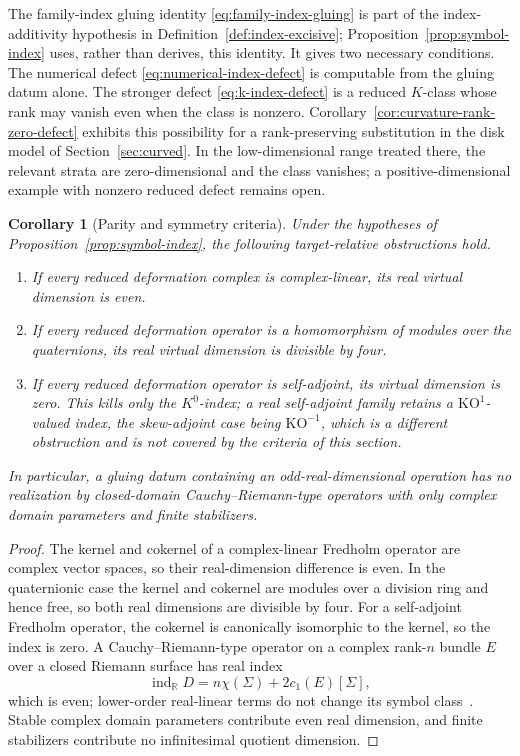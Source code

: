 \documentclass[11pt,letterpaper,twoside]{article}
\theoremstyle{plain}
\newtheorem{corollary}[theorem]{Corollary}
\theoremstyle{definition}
\theoremstyle{remark}
\let\cite\citep
\begin{document}
The family-index gluing identity \eqref{eq:family-index-gluing} is part of the index-additivity hypothesis in Definition~\ref{def:index-excisive}; Proposition~\ref{prop:symbol-index} uses, rather than derives, this identity.  It gives two necessary conditions.  The numerical defect \eqref{eq:numerical-index-defect} is computable from the gluing datum alone.  The stronger defect \eqref{eq:k-index-defect} is a reduced \(K\)-class whose rank may vanish even when the class is nonzero.  Corollary~\ref{cor:curvature-rank-zero-defect} exhibits this possibility for a rank-preserving substitution in the disk model of Section~\ref{sec:curved}.  In the low-dimensional range treated there, the relevant strata are zero-dimensional and the class vanishes; a positive-dimensional example with nonzero reduced defect remains open.

\begin{corollary}[Parity and symmetry criteria]\label{cor:index-symmetry}
Under the hypotheses of Proposition~\ref{prop:symbol-index}, the following target-relative obstructions hold.
\begin{enumerate}
\item If every reduced deformation complex is complex-linear, its real virtual dimension is even.
\item If every reduced deformation operator is a homomorphism of modules over the quaternions, its real virtual dimension is divisible by four.
\item If every reduced deformation operator is self-adjoint, its virtual dimension is zero.  This kills only the \(K^0\)-index; a real self-adjoint family retains a \(\mathrm{KO}^{1}\)-valued index, the skew-adjoint case being \(\mathrm{KO}^{-1}\), which is a different obstruction and is not covered by the criteria of this section.
\end{enumerate}
In particular, a gluing datum containing an odd-real-dimensional operation has no realization by closed-domain Cauchy--Riemann-type operators with only complex domain parameters and finite stabilizers.
\end{corollary}

\begin{proof}
The kernel and cokernel of a complex-linear Fredholm operator are complex vector spaces, so their real-dimension difference is even.  In the quaternionic case the kernel and cokernel are modules over a division ring and hence free, so both real dimensions are divisible by four.  For a self-adjoint Fredholm operator, the cokernel is canonically isomorphic to the kernel, so the index is zero.  A Cauchy--Riemann-type operator on a complex rank-$n$ bundle $E$ over a closed Riemann surface has real index
\begin{equation}\label{eq:closed-cr-index}
 \operatorname{ind}_{\mathbb R}D
 =n\chi(\Sigma)+2c_1(E)[\Sigma],
\end{equation}
which is even; lower-order real-linear terms do not change its symbol class~\cite{atiyahsinger1968iii,mcduffsalamon2012}.  Stable complex domain parameters contribute even real dimension, and finite stabilizers contribute no infinitesimal quotient dimension.
\end{proof}
\end{document}
